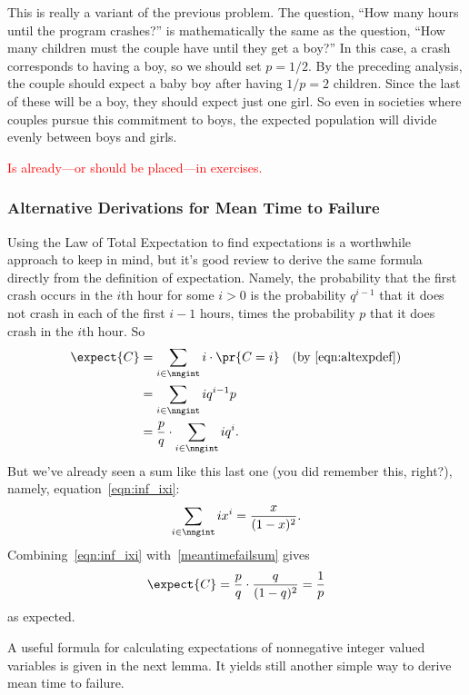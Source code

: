 This is really a variant of the previous problem.  The question, ``How
many hours until the program crashes?'' is mathematically the same as
the question, ``How many children must the couple have until they get
a boy?''  In this case, a crash corresponds to having a boy, so we
should set $p = 1/2$.  By the preceding analysis, the couple should
expect a baby boy after having $1/p = 2$ children.  Since the last of
these will be a boy, they should expect just one girl.  So even in
societies where couples pursue this commitment to boys, the expected
population will divide evenly between boys and girls.

\begin{editingnotes}

\textcolor{red}{Is already---or should be placed---in exercises.}

\subsubsection*{Alternative Derivations for Mean Time to Failure}
Using the Law of Total Expectation to find expectations is a worthwhile
approach to keep in mind, but it's good review to derive the same
formula directly from the definition of expectation.  Namely, the
probability that the first crash occurs in the $i$th hour for some $i
>0$ is the probability $q^{i-1}$ that it does not crash in each
of the first $i-1$ hours, times the probability $p$ that it does
crash in the $i$th hour.  So
\begin{align}
\expect{C} & = \sum_{i \in \nngint} i \cdot \pr{C=i}
               & \text{(by~\eqref{eqn:altexpdef})}\notag\\
           & = \sum_{i \in \nngint} i q^{i-1}p\notag\\
           &= \frac{p}{q} \cdot \sum_{i \in \nngint} i q^i.\label{meantimefailsum}
\end{align}
But we've already seen a sum like this last one (you did remember
this, right?), namely, equation~\eqref{eqn:inf_ixi}:
\[
\sum_{i \in \nngint} ix^i =\frac{x}{(1-x)^2}.
\]
Combining~\eqref{eqn:inf_ixi} with~\eqref{meantimefailsum} gives
\[
\expect{C} = \frac{p}{q} \cdot \frac{q}{(1-q)^2} = \frac{1}{p}
\]
as expected.

A useful formula for calculating expectations of nonnegative integer
valued variables is given in the next lemma.  It yields still another
simple way to derive mean time to failure.


\end{editingnotes}
